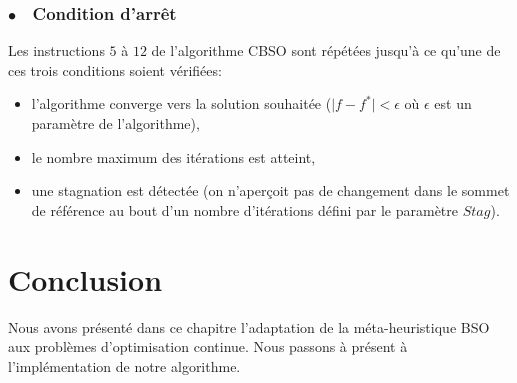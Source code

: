 \subsubsection{$\bullet\quad$Condition d'arrêt}
Les instructions $5$ à $12$ de l'algorithme CBSO sont répétées jusqu'à ce qu'une de ces trois conditions soient vérifiées: 

\begin{itemize}
	\item l'algorithme converge vers la solution souhaitée ($\vert f-f^* \vert < \epsilon$ où $\epsilon$ est un paramètre de l'algorithme),
	\item le nombre maximum des itérations est atteint, 
	\item une stagnation est détectée (on n'aperçoit pas de changement dans le sommet de référence au bout d'un nombre d'itérations défini par le paramètre $Stag$). 
\end{itemize} 
 
\section*{Conclusion}
Nous avons présenté dans ce chapitre l'adaptation de la méta-heuristique BSO aux problèmes d'optimisation continue. Nous passons à présent à l'implémentation de notre algorithme.
